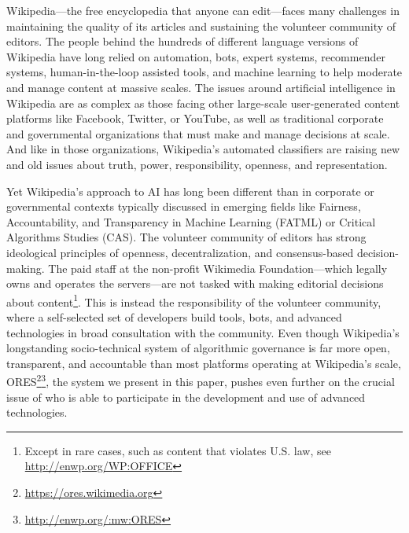 Wikipedia---the free encyclopedia that anyone can edit---faces many challenges in maintaining the quality of its articles and sustaining the volunteer community of editors. The people behind the hundreds of different language versions of Wikipedia have long relied on automation, bots, expert systems, recommender systems, human-in-the-loop assisted tools, and machine learning to help moderate and manage content at massive scales. The issues around artificial intelligence in Wikipedia are as complex as those facing other large-scale user-generated content platforms like Facebook, Twitter, or YouTube, as well as traditional corporate and governmental organizations that must make and manage decisions at scale. And like in those organizations, Wikipedia's automated classifiers are raising new and old issues about truth, power, responsibility, openness, and representation.

Yet Wikipedia's approach to AI has long been different than in corporate or governmental contexts typically discussed in emerging fields like Fairness, Accountability, and Transparency in Machine Learning (FATML) or Critical Algorithms Studies (CAS). The volunteer community of editors has strong ideological principles of openness, decentralization, and consensus-based decision-making. The paid staff at the non-profit Wikimedia Foundation---which legally owns and operates the servers---are not tasked with making editorial decisions about content\footnote{Except in rare cases, such as content that violates U.S. law, see \url{http://enwp.org/WP:OFFICE}}. This is instead the responsibility of the volunteer community, where a self-selected set of developers build tools, bots, and advanced technologies in broad consultation with the community. Even though Wikipedia's longstanding socio-technical system of algorithmic governance is far more open, transparent, and accountable than most platforms operating at Wikipedia's scale, ORES\footnote{\url{https://ores.wikimedia.org}}\footnote{\url{http://enwp.org/:mw:ORES}}, the system we present in this paper, pushes even further on the crucial issue of who is able to participate in the development and use of advanced technologies.


